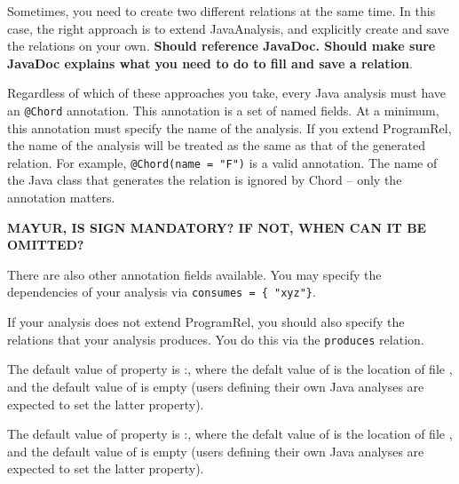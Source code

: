 Sometimes, you need to create two different relations at the same time. In this case, the right approach is to
extend JavaAnalysis, and explicitly create and save the relations on your own.
\textbf{Should reference JavaDoc.  Should make sure JavaDoc explains what you need to do to fill and save a relation}.

Regardless of which of these approaches you take, every Java analysis must have an \texttt{@Chord} annotation.
This annotation is a set of named fields.
At a minimum, this annotation must specify the name of the analysis.
If you extend ProgramRel, the name of the analysis will be treated as the same as that of the generated relation.
For example, \texttt{@Chord(name = "F")} is a valid annotation. 
The name of the Java class that generates the relation is ignored by Chord -- only the annotation matters.

\textbf{MAYUR, IS SIGN MANDATORY?   IF NOT, WHEN CAN IT BE OMITTED?}

There are also other annotation fields available.
You may specify the dependencies of your analysis via \texttt{consumes = \{ "xyz"\}}.

If your analysis does not extend ProgramRel, you should also specify the relations that your 
analysis produces. You do this via the \texttt{produces} relation.

%
%

\noindent  The default value of property 
is :,
where the defalt value of  is the location of file , and
the default value of  is empty (users defining their own Java analyses are expected to
set the latter property).

\noindent  The default value of property 
is :,
where the defalt value of  is the location of file , and
the default value of  is empty (users defining their own Java analyses are expected to
set the latter property).


